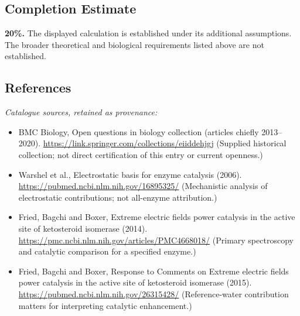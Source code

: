 \documentclass[11pt]{article}
\begin{document}
\subsection{Completion Estimate}
\textbf{20\%.} The displayed calculation is established under its additional assumptions. The broader theoretical and biological requirements listed above are not established.
\subsection{References}
\noindent\emph{Catalogue sources, retained as provenance:}
\begin{itemize}
\item BMC Biology, Open questions in biology collection (articles chiefly 2013--2020). \url{https://link.springer.com/collections/eiiddehjgj} (Supplied historical collection; not direct certification of this entry or current openness.)
\item Warshel et al., Electrostatic basis for enzyme catalysis (2006). \url{https://pubmed.ncbi.nlm.nih.gov/16895325/} (Mechanistic analysis of electrostatic contributions; not all-enzyme attribution.)
\item Fried, Bagchi and Boxer, Extreme electric fields power catalysis in the active site of ketosteroid isomerase (2014). \url{https://pmc.ncbi.nlm.nih.gov/articles/PMC4668018/} (Primary spectroscopy and catalytic comparison for a specified enzyme.)
\item Fried, Bagchi and Boxer, Response to Comments on Extreme electric fields power catalysis in the active site of ketosteroid isomerase (2015). \url{https://pubmed.ncbi.nlm.nih.gov/26315428/} (Reference-water contribution matters for interpreting catalytic enhancement.)
\end{itemize}
\end{document}
